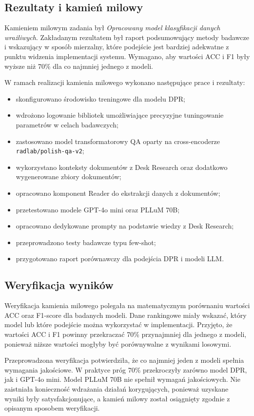 \documentclass[12pt,a4paper]{report}
\begin{document}
\subsection{Rezultaty i kamień milowy}
Kamieniem milowym zadania był \textit{Opracowany model klasyfikacji danych wrażliwych}. Zakładanym rezultatem był raport podsumowujący metody badawcze i wskazujący w sposób mierzalny, które podejście jest bardziej adekwatne z punktu widzenia implementacji systemu. Wymagano, aby wartości ACC i F1 były wyższe niż 70\% dla co najmniej jednego z modeli.

W ramach realizacji kamienia milowego wykonano następujące prace i rezultaty:

\begin{itemize}
    \item skonfigurowano środowisko treningowe dla modelu DPR;
    \item wdrożono logowanie bibliotek umożliwiające precyzyjne tuningowanie parametrów w celach badawczych;
    \item zastosowano model transformatorowy QA oparty na cross-encoderze \texttt{radlab/polish-qa-v2};
    \item wykorzystano konteksty dokumentów z Desk Research oraz dodatkowo wygenerowane zbiory dokumentów;
    \item opracowano komponent Reader do ekstrakcji danych z dokumentów;
    \item przetestowano modele GPT-4o mini oraz PLLuM 70B;
    \item opracowano dedykowane prompty na podstawie wiedzy z Desk Research;
    \item przeprowadzono testy badawcze typu few-shot;
    \item przygotowano raport porównawczy dla podejścia DPR i modeli LLM.
\end{itemize}

\subsection{Weryfikacja wyników}
Weryfikacja kamienia milowego polegała na matematycznym porównaniu wartości ACC oraz F1-score dla badanych modeli. Dane rankingowe miały wskazać, który model lub które podejście można wykorzystać w implementacji. Przyjęto, że wartości ACC i F1 powinny przekraczać 70\% przynajmniej dla jednego z modeli, ponieważ niższe wartości mogłyby być porównywalne z wynikami losowymi.

Przeprowadzona weryfikacja potwierdziła, że co najmniej jeden z modeli spełnia wymagania jakościowe. W praktyce próg 70\% przekroczyły zarówno model DPR, jak i GPT-4o mini. Model PLLuM 70B nie spełnił wymagań jakościowych. Nie zaistniała konieczność wdrażania działań korygujących, ponieważ uzyskane wyniki były satysfakcjonujące, a kamień milowy został osiągnięty zgodnie z opisanym sposobem weryfikacji.
\end{document}
